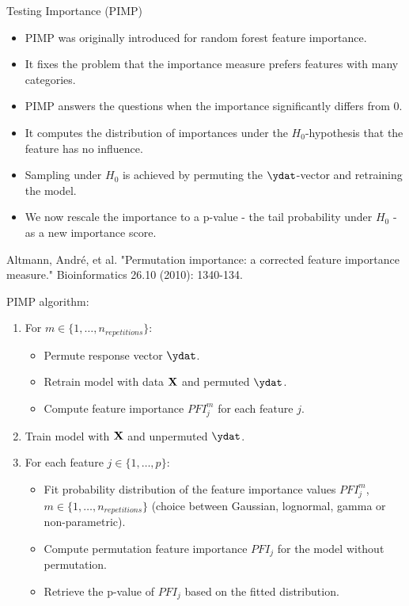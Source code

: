 \documentclass[11pt,compress,t,notes=noshow, xcolor=table]{beamer}
\begin{document}
\begin{vbframe}{Testing Importance (PIMP)}

\begin{itemize}
  \item PIMP was originally introduced for random forest feature importance.
  \item It fixes the problem that the importance measure prefers features with many categories.
  \item PIMP answers the questions when the importance significantly differs from 0. 
  \item It computes the distribution of importances under the $H_0$-hypothesis that the feature has no influence.
  \item Sampling under $H_0$ is achieved by permuting the $\ydat$-vector and retraining the model.
  \item We now rescale the importance to a p-value - the tail probability under $H_0$ - as a new importance score. 
\end{itemize}

{\tiny{Altmann, André, et al. "Permutation importance: a corrected feature importance measure." 
Bioinformatics 26.10 (2010): 1340-134.}}

\framebreak

PIMP algorithm:
\begin{enumerate}
	\item For $m \in \{1, \ldots, n_{repetitions}\}$:
		\begin{itemize}
			\item Permute response vector $\ydat$.
			\item Retrain model with data $\Xmat$ and permuted $\ydat$.
			\item Compute feature importance $PFI_j^m$ for each feature $j$.
		\end{itemize}
	\item Train model with $\Xmat$ and unpermuted $\ydat$.
	\item For each feature $j \in \{1,\ldots,p\}$:
		\begin{itemize}
			\item Fit probability distribution of the feature importance values $PFI_j^m$, $m \in \{1, \ldots, n_{repetitions}\}$ (choice between Gaussian, lognormal, gamma or non-parametric).
			\item Compute permutation feature importance $PFI_j$ for the model without permutation.
			\item Retrieve the p-value of $PFI_j$ based on the fitted distribution.
		\end{itemize}
\end{enumerate}
\end{vbframe}
\end{document}
